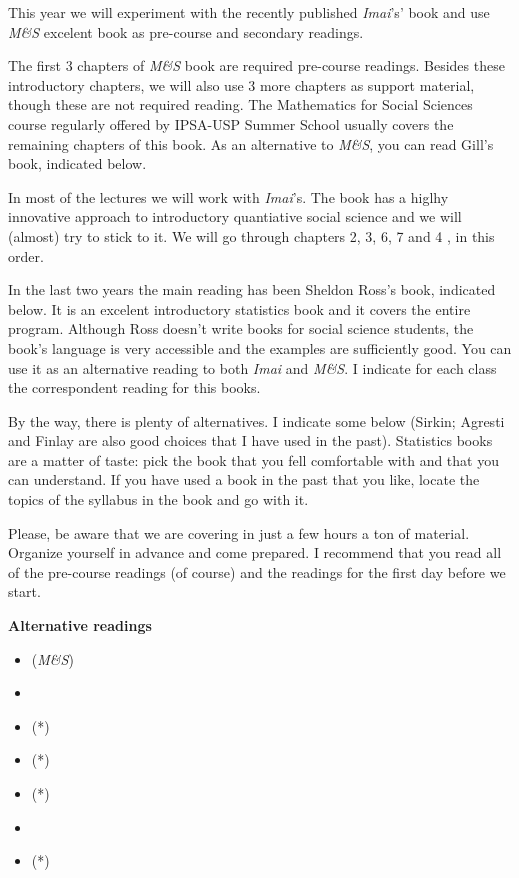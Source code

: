 \documentclass[a4paper,11pt]{article}
\begin{document}
This year we will experiment with the recently published \emph{Imai}'s' book and use \emph{M\&S} excelent book as pre-course and secondary readings.

The first 3 chapters of \emph{M\&S} book are required pre-course readings. Besides these introductory chapters, we will also use 3 more chapters as support material, though these are not required reading. The Mathematics for Social Sciences course regularly offered by IPSA-USP Summer School usually covers the remaining chapters of this book. As an alternative to \emph{M\&S}, you can read Gill's book, indicated below.

In most of the lectures we will work with \emph{Imai}'s. The book has a higlhy innovative approach to introductory quantiative social science and we will (almost) try to stick to it. We will go through chapters 2, 3, 6, 7 and 4 , in this order.

In the last two years the main reading has been Sheldon Ross's book, indicated below. It is an excelent introductory statistics book and it covers the entire program. Although Ross doesn't write books for social science students, the book's language is very accessible and the examples are sufficiently  good. You can use it as an alternative reading to both \emph{Imai} and \emph{M\&S}. I indicate for each class the correspondent reading for this books.

By the way, there is plenty of alternatives. I indicate some below (Sirkin; Agresti and Finlay are also good choices that I have used in the past). Statistics books are a matter of taste: pick the book that you fell comfortable with and that you can understand. If you have used a book in the past that you like, locate the topics of the syllabus in the book and go with it.

Please, be aware that we are covering in just a few hours a ton of material. Organize yourself in advance and come prepared. I recommend that you read all of the pre-course readings (of course) and the readings for the first day before we start.

\textbf{Alternative readings}

\begin{itemize}
  \item (\emph{M\&S}) 
  \item {}
  \item {} (*)
  \item {} (*)
  \item {} (*)
  \item {}
  \item {} (*)
\end{itemize}
\end{document}
